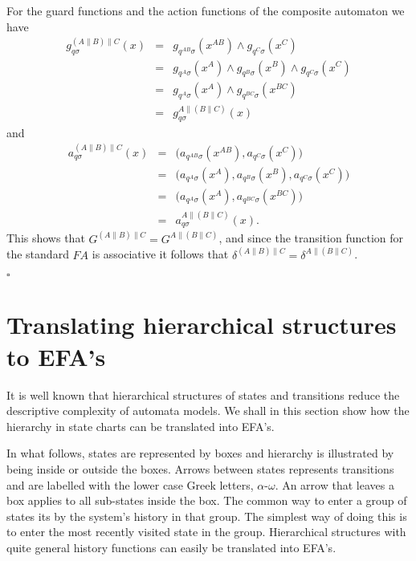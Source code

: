 \documentclass{article}
\begin{document}
For the guard functions and the action functions of the composite
automaton we have
\begin{eqnarray}
g^{(A\|B)\|C}_{q \sigma}(x)&=& g_{q^{AB}\sigma}(x^{AB})\wedge
g_{q^C\sigma}(x^{C})\nonumber\\
&=&g_{q^A\sigma}(x^{A})\wedge g_{q^B\sigma}(x^{B})\wedge
g_{q^C\sigma}(x^{C})\nonumber\\
&=& g_{q^{A}\sigma}(x^{A})\wedge g_{q^{BC}\sigma}(x^{BC})\nonumber\\
&=& g^{A\|(B\|C)}_{q \sigma}(x)
\end{eqnarray}
and
\begin{eqnarray}
a^{(A\|B)\|C}_{q \sigma}(x)&=&
 \big(a_{q^{AB} \sigma}(x^{AB}), a_{q^{C}
 \sigma}(x^{C})\big)\nonumber\\
&=&\big(a_{q^{A} \sigma}(x^{A}), a_{q^{B}
 \sigma}(x^{B}), a_{q^{C}
 \sigma}(x^{C})\big)\nonumber\\
&=&\big(a_{q^{A} \sigma}(x^{A}), a_{q^{BC}
 \sigma}(x^{BC})\big)\nonumber\\
&=&a^{A\|(B\|C)}_{q \sigma}(x).
\end{eqnarray}
This shows that $G^{(A\|B)\|C}=G^{A\|(B\|C)}$, and since the
transition function for the standard $FA$ is associative it
follows that $\delta^{(A\|B)\|C}=\delta^{A\|(B\|C)}$.
\begin{flushright}$\square$\end{flushright}




\section{Translating hierarchical structures to EFA's} It is well
known that hierarchical structures of states and transitions
reduce the descriptive complexity of automata models. We shall in
this section show how the hierarchy in state charts can be
translated into EFA's.

In what follows, states are represented by boxes and hierarchy is
illustrated by being inside or outside the boxes. Arrows between
states represents transitions and are labelled with the lower case
Greek letters, $\alpha$-$\omega$. An arrow that leaves a box
applies to all sub-states inside the box. The common way to enter
a group of states its by the system's history in that group. The
simplest way of doing this is to enter the most recently visited
state in the group. Hierarchical structures with quite general
history functions can easily be translated into EFA's.
\end{document}
